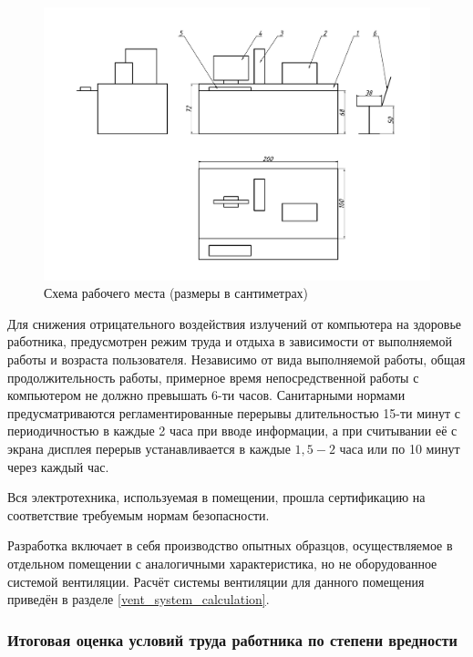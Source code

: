 \begin{figure}[ht!]
    \centering
    \includegraphics[width=\textwidth, keepaspectratio, clip=true, trim=0mm 10mm 0mm 15mm]
                    {./src/ecology/pictures/workplace_scheme}
    \caption{Схема рабочего места (размеры в сантиметрах)}
    \label{pic_workplace_scheme}
\end{figure}

Для снижения отрицательного воздействия излучений от компьютера
на здоровье работника, предусмотрен режим труда и отдыха в зависимости от выполняемой
работы и возраста пользователя. Независимо от вида выполняемой работы, общая
продолжительность работы, примерное время непосредственной работы с компьютером
не должно превышать 6-ти часов. Санитарными нормами предусматриваются регламентированные
перерывы длительностью 15-ти минут с периодичностью в каждые 2 часа при вводе
информации, а при считывании её с экрана дисплея перерыв устанавливается в
каждые $1,5 - 2$ часа или по 10 минут через каждый час.

Вся электротехника, используемая в помещении, прошла сертификацию на соответствие
требуемым нормам безопасности.

Разработка включает в себя производство опытных образцов, осуществляемое в отдельном
помещении с аналогичными характеристика, но не оборудованное системой вентиляции.
Расчёт системы вентиляции для данного помещения приведён в разделе \ref{vent_system_calculation}.



\subsubsection{Итоговая оценка условий труда работника по степени вредности}

